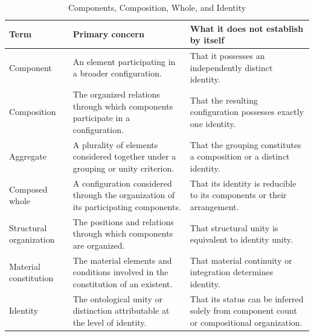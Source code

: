 %
%
%
%

\begin{table}[htbp]
\centering
\caption{Components, Composition, Whole, and Identity}
\label{tab:components-composition-whole-and-identity}

\small
\renewcommand{\arraystretch}{1.35}

\begin{tabular}{p{} p{} p{}}
\hline
\textbf{Term}
&
\textbf{Primary concern}
&
\textbf{What it does not establish by itself}
\\
\hline

Component
&
An element participating in a broader configuration.
&
That it possesses an independently distinct identity.
\\

Composition
&
The organized relations through which components
participate in a configuration.
&
That the resulting configuration possesses exactly
one identity.
\\

Aggregate
&
A plurality of elements considered together under
a grouping or unity criterion.
&
That the grouping constitutes a composition or
a distinct identity.
\\

Composed whole
&
A configuration considered through the organization
of its participating components.
&
That its identity is reducible to its components
or their arrangement.
\\

Structural organization
&
The positions and relations through which components
are organized.
&
That structural unity is equivalent to identity unity.
\\

Material constitution
&
The material elements and conditions involved
in the constitution of an existent.
&
That material continuity or integration determines
identity.
\\

Identity
&
The ontological unity or distinction attributable
at the level of identity.
&
That its status can be inferred solely from
component count or compositional organization.
\\

\hline
\end{tabular}

\end{table}

